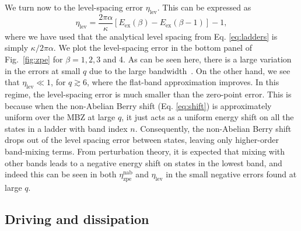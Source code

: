 \documentclass[twocolumn, 10pt, aps, superscriptaddress, floatfix, showpacs, pra, citeautoscript]{revtex4-1}
\begin{document}
We turn now to the level-spacing error $\eta_{\text{lev}}$. This can be expressed as 
\begin{equation}
\eta_{\text{lev}} = \frac{2\pi \alpha}{\kappa} [E_{\text{ex}}(\beta)
- E_{\text{ex}}(\beta - 1)] -1, 
\end{equation}
where we have used that the analytical level spacing from Eq. \ref{eq:ladders} is simply $\kappa / 2\pi \alpha$. 
We plot the level-spacing error in the bottom panel of Fig.~\ref{fig:zpe} for $\beta = 1, 2, 3$ and 4. As can be seen here, there is a large variation in the errors at small $q$ due to the large bandwidth~\cite{ozawa2014momhh}. On the other hand, we see that $\eta_{\text{lev}} \ll 1$, for $q \gtrsim 6$, where the flat-band approximation improves. In this regime, the level-spacing error is much smaller than the zero-point error. This is because when the non-Abelian Berry shift (Eq. \ref{eq:shift}) is approximately uniform over the MBZ at large $q$, it just acts as a uniform energy shift on all the states in a  ladder with band index $n$. Consequently, the non-Abelian Berry shift drops out of the level spacing error between states, leaving only higher-order band-mixing terms. From perturbation theory, it is expected that mixing with other bands leads to a negative energy shift on states in the lowest band, and indeed this can be seen in both $\eta_{\text{zpe}}^{\text{nab}}$ and $\eta_{\text{lev}}$ in the small negative errors found at large $q$. 

\subsection{Driving and dissipation}\label{sec:driven-dissipation}
\end{document}
